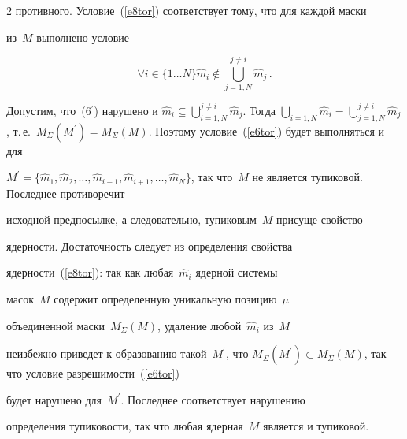 \begin{multicols}{2}
противного. Условие~(\ref{e8tor}) соответствует тому, что для каждой маски 

из~$M$ выполнено условие

\setcounter{equation}{5}

\begin{equation}

\forall i\in  \{ 1\ldots N\} \hat{m}_i\notin \bigcup\limits_{j=1,N}^{j\not= i} \hat{m}_j\,.

\end{equation}

\renewcommand{\theequation}{\arabic{equation}}





\noindent

Допустим, что~(6$^\prime$) нарушено и $\hat{m}_i\subseteq 

\bigcup\limits_{i=1,N}^{j\not= i} \hat{m}_j$. Тогда $\bigcup\limits_{i=1,N} \hat{m}_i 

=\bigcup\limits_{j=1,N}^{j\not= i} \hat{m}_j$, т.\,е.\ $M_\Sigma (M^\prime) 

=M_\Sigma(M)$. Поэтому условие~(\ref{e6tor}) будет выполняться и для 

$M^\prime = \{ \hat{m}_1, \hat{m}_2, \ldots , \hat{m}_{i-1}, \hat{m}_{i+1}, \ldots 

, \hat{m}_N\}$, так что~$M$ не является тупиковой. Последнее противоречит\linebreak 

исходной предпосылке, а следовательно, тупиковым~$M$ присуще свойство 

ядер\-ности. Достаточность следует из определения свойства 

ядер\-ности~(\ref{e8tor}): так как любая~$\hat{m}_i$ ядерной системы\linebreak 

масок~$M$ содержит определенную уникальную позицию~$\mu$ 

объединенной маски~$M_\Sigma(M)$, удаление любой~$\hat{m}_i$ из~$M$ 

неизбежно приведет к образованию такой~$M^\prime$, что $M_\Sigma 

(M^\prime )\subset M_\Sigma(M)$, так что условие разрешимости~(\ref{e6tor}) 

будет нарушено для~$M^\prime$. Последнее соответствует нарушению 

определения тупиковости, так что любая  ядерная~$M$ является и тупиковой. 


\end{multicols}
